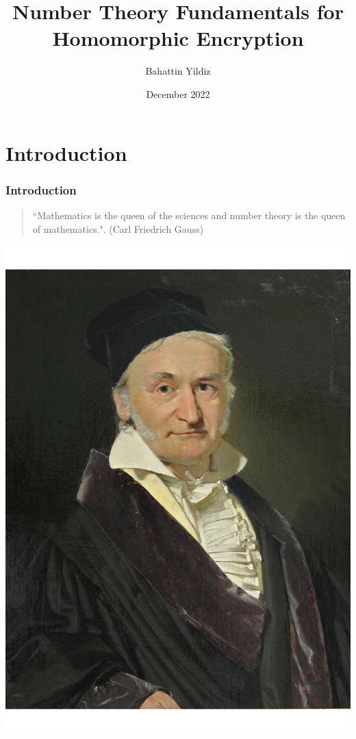 \documentclass[ %
 usenames,dvipsnames,
aspectratio=169,11pt ]{beamer}
\begin{document}
\title[Number Theory Fundamentals]{
Number Theory Fundamentals for Homomorphic Encryption}
\author{Bahattin Yildiz}
\date[December]{December 2022}
\maketitle

\section{Introduction}

\begin{frame}\frametitle{Introduction}

\begin{quote}
{ ``Mathematics is the queen of the sciences and number theory is the queen of mathematics.". (Carl Friedrich Gauss)}
\end{quote}

\bigskip
\noindent
\begin{center}
    \includegraphics[scale=.20]{images/Gauss.pdf}
\end{center}
\end{frame}
\end{document}

